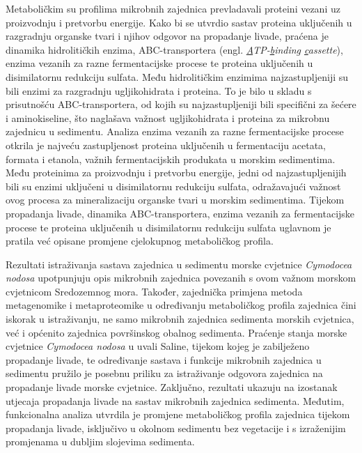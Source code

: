 \documentclass[
  12 pt,
]{book}
\begin{document}
{Metaboličkim su profilima mikrobnih zajednica prevladavali proteini vezani uz proizvodnju i pretvorbu energije. Kako bi se utvrdio sastav proteina uključenih u razgradnju organske tvari i njihov odgovor na propadanje livade, praćena je dinamika hidrolitičkih enzima, ABC-transportera (engl. \emph{\underline{A}TP-\underline{b}inding \underline{c}assette}), enzima vezanih za razne fermentacijske procese te proteina uključenih u disimilatornu redukciju sulfata. Među hidrolitičkim enzimima najzastupljeniji su bili enzimi za razgradnju ugljikohidrata i proteina. To je bilo u skladu s prisutnošću ABC-transportera, od kojih su najzastupljeniji bili specifični za šećere i aminokiseline, što naglašava važnost ugljikohidrata i proteina za mikrobnu zajednicu u sedimentu. Analiza enzima vezanih za razne fermentacijske procese otkrila je najveću zastupljenost proteina uključenih u fermentaciju acetata, formata i etanola, važnih fermentacijskih produkata u morskim sedimentima. Među proteinima za proizvodnju i pretvorbu energije, jedni od najzastupljenijih bili su enzimi uključeni u disimilatornu redukciju sulfata, odražavajući važnost ovog procesa za mineralizaciju organske tvari u morskim sedimentima. Tijekom propadanja livade, dinamika ABC-transportera, enzima vezanih za fermentacijske procese te proteina uključenih u disimilatornu redukciju sulfata uglavnom je pratila već opisane promjene cjelokupnog metaboličkog profila.

Rezultati istraživanja sastava zajednica u sedimentu morske cvjetnice \emph{Cymodocea nodosa} upotpunjuju opis mikrobnih zajednica povezanih s ovom važnom morskom cvjetnicom Sredozemnog mora. Također, zajednička primjena metoda metagenomike i metaproteomike u određivanju metaboličkog profila zajednica čini iskorak u istraživanju, ne samo mikrobnih zajednica sedimenta morskih cvjetnica, već i općenito zajednica površinskog obalnog sedimenta. Praćenje stanja morske cvjetnice \emph{Cymodocea nodosa} u uvali Saline, tijekom kojeg je zabilježeno propadanje livade, te određivanje sastava i funkcije mikrobnih zajednica u sedimentu pružilo je posebnu priliku za istraživanje odgovora zajednica na propadanje livade morske cvjetnice. Zaključno, rezultati ukazuju na izostanak utjecaja propadanja livade na sastav mikrobnih zajednica sedimenta. Međutim, funkcionalna analiza utvrdila je promjene metaboličkog profila zajednica tijekom propadanja livade, isključivo u okolnom sedimentu bez vegetacije i s izraženijim promjenama u dubljim slojevima sedimenta.

    
}
\end{document}

